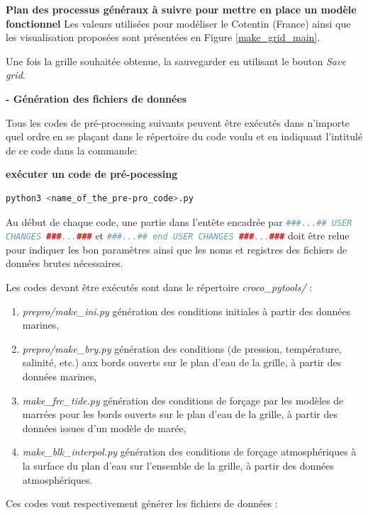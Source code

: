 \documentclass[10pt,a4paper,titlepage]{article}
\begin{document}
\begin{processEnv}{\textbf{Plan des processus généraux à suivre pour mettre en place un modèle fonctionnel}}
    Les valeurs utilisées pour modéliser le Cotentin (France) ainsi que les visualisation proposées sont présentées en Figure \ref{make_grid_main}.

    Une fois la grille souhaitée obtenue, la sauvegarder en utilisant le bouton \textit{Save grid}.

    \textbf{- Génération des fichiers de données}

    Tous les codes de pré-processing suivants peuvent être exécutés dans n'importe quel ordre en se plaçant dans le répertoire du code voulu et en indiquant l'intitulé de ce code dans la commande:

    \begin{codeEnv}{\textbf{exécuter un code de pré-pocessing}}
        \begin{lstlisting}[language=bash]
            python3 <name_of_the_pre-pro_code>.py
        \end{lstlisting}
    \end{codeEnv}

    Au début de chaque code, une partie dans l'entête encadrée par \lstinline[language=python]|###...## USER CHANGES ###...###| et \lstinline[language=python]|###...## end USER CHANGES ###...###| doit être relue pour indiquer les bon paramètres ainsi que les noms et registres des fichiers de données brutes nécessaires.

    Les codes devant être exécutés sont dans le répertoire \textit{croco\_pytools/} :

    \begin{enumerate}
        \item \textit{prepro/make\_ini.py} génération des conditions initiales à partir des données marines,
        \item \textit{prepro/make\_bry.py} génération des conditions (de pression, température, salinité, etc.) aux bords ouverts sur le plan d'eau de la grille, à partir des données marines,
        \item \textit{make\_frc\_tide.py} génération des conditions de forçage par les modèles de marrées pour les bords ouverts sur le plan d'eau de la grille, à partir des données issues d'un modèle de marée,
        \item \textit{make\_blk\_interpol.py} génération des conditions de forçage atmosphériques à la surface du plan d'eau sur l'ensemble de la grille, à partir des données atmosphériques.
    \end{enumerate}

    Ces codes vont respectivement générer les fichiers de données :


\end{processEnv}
\end{document}
